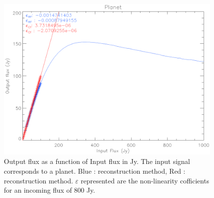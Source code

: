 \begin{figure}[h]
\center
	\includegraphics[scale=0.5]{Figures/nl-planet.eps}
	\caption{Output flux as a function of Input flux in Jy. The input signal corresponds to a planet. Blue : \rf reconstruction method, Red : \cf reconstruction method. $\varepsilon$  represented are the non-linearity cofficients for an incoming flux of 800 Jy.}
	\label{fig:nl-planet}
\end{figure}

